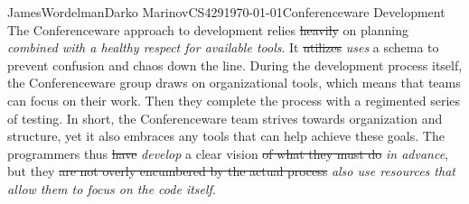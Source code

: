 \documentclass[12pt,letterpaper]{article}
\begin{document}
\begin{mla}{James}{Wordelman}{Darko Marinov}{CS429}{\today}{Conferenceware
Development}
The Conferenceware approach to development relies \sout{heavily} on planning \textit{combined with a healthy respect for available tools}. It \sout{utilizes} \textit{uses} a schema to prevent confusion and chaos down the line. During the development process itself, the Conferenceware group draws on organizational tools, which means that teams can focus on their work.  Then they complete the process with a regimented series of testing. In short, the Conferenceware team strives towards organization and structure, yet it also embraces any tools that can help achieve these goals. The programmers thus \sout{have} \textit{develop} a clear vision \sout{of what they must do} \textit{in advance}, but they \sout{are not overly encumbered by the actual process} \textit{also use resources that allow them to focus on the code itself}.
\end{mla}
\end{document}
